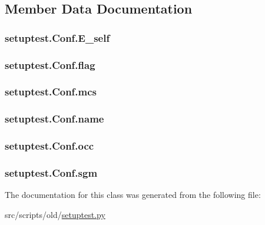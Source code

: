 \subsection{Member Data Documentation}
\hypertarget{classsetuptest_1_1_conf_a986003b2244aef6dfb9f691bda3719e5}{
\subsubsection[{E\-\_\-self}]{\setlength{\rightskip}{0pt plus 5cm}setuptest.\-Conf.\-E\-\_\-self}}\label{classsetuptest_1_1_conf_a986003b2244aef6dfb9f691bda3719e5}
\hypertarget{classsetuptest_1_1_conf_a11548ab44fdc3b46377a905ac60407c4}{
\subsubsection[{flag}]{\setlength{\rightskip}{0pt plus 5cm}setuptest.\-Conf.\-flag}}\label{classsetuptest_1_1_conf_a11548ab44fdc3b46377a905ac60407c4}
\hypertarget{classsetuptest_1_1_conf_aa03d2c623ea2025ce30627696a2c89dd}{
\subsubsection[{mcs}]{\setlength{\rightskip}{0pt plus 5cm}setuptest.\-Conf.\-mcs}}\label{classsetuptest_1_1_conf_aa03d2c623ea2025ce30627696a2c89dd}
\hypertarget{classsetuptest_1_1_conf_a452e948db88329edca628da42df7efa4}{
\subsubsection[{name}]{\setlength{\rightskip}{0pt plus 5cm}setuptest.\-Conf.\-name}}\label{classsetuptest_1_1_conf_a452e948db88329edca628da42df7efa4}
\hypertarget{classsetuptest_1_1_conf_aa0a737a680ff2ce3e2ecd1a1f2611dd0}{
\subsubsection[{occ}]{\setlength{\rightskip}{0pt plus 5cm}setuptest.\-Conf.\-occ}}\label{classsetuptest_1_1_conf_aa0a737a680ff2ce3e2ecd1a1f2611dd0}
\hypertarget{classsetuptest_1_1_conf_adb6b4cbd0a0cefeaa6618ed939240d47}{
\subsubsection[{sgm}]{\setlength{\rightskip}{0pt plus 5cm}setuptest.\-Conf.\-sgm}}\label{classsetuptest_1_1_conf_adb6b4cbd0a0cefeaa6618ed939240d47}


The documentation for this class was generated from the following file\-:\begin{DoxyCompactItemize}
\item 
src/scripts/old/\hyperlink{setuptest_8py}{setuptest.\-py}\end{DoxyCompactItemize}
